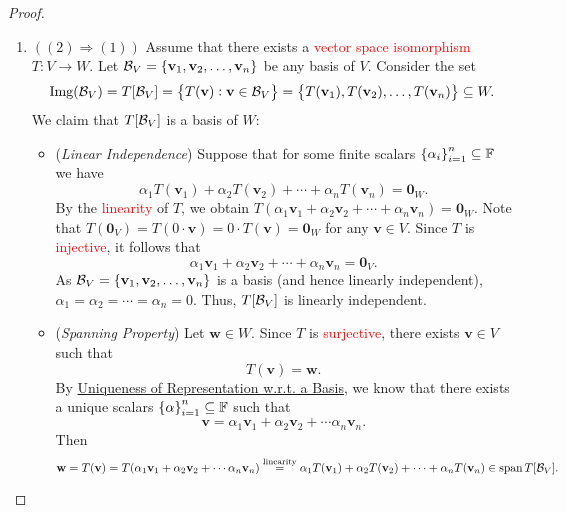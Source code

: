 \documentclass[11pt,openany]{article}
\renewcommand{\vec}[1]{\mathbf{#1}}
\begin{document}
\newpage
{}
\begin{proof}
	\begin{enumerate}[]
		\item $((2)\Rightarrow (1))$ Assume that there exists a \textcolor{red}{vector space isomorphism} $T:V\to W$. Let $\basis_V=\set{\vec{v}_1,\vec{v}_2,\dots,\vec{v}_n}$ be any basis of $V$. Consider the set \[
		\img{\basis_V}=T[\basis_V]=\set{T(\vec{v}):\vec{v}\in \basis_V}=\set{T(\vec{v}_1),T(\vec{v}_2),\dots,T(\vec{v}_n)}\subseteq W.
		\] We claim that $T[\mathcal{B}_V]$ is a basis of $W$: \begin{itemize}
			\item (\textit{Linear Independence}) Suppose that for some finite scalars $\set{\alpha_i}_{i=1}^n\subseteq \mathbb{F}$ we have \[
			\alpha_1T(\vec{v}_1)+\alpha_2T(\vec{v}_2)+\cdots+\alpha_nT(\vec{v}_n)=\vec{0}_W.
			\] By the \textcolor{red}{linearity} of $T$, we obtain $T(\alpha_1\vec{v}_1+\alpha_2\vec{v}_2+\cdots+\alpha_n\vec{v}_n)=\vec{0}_W$. Note that $T(\vec{0}_V)=T(0\cdot\vec{v})=0\cdot T(\vec{v})=\vec{0}_W$ for any $\vec{v}\in V$. Since $T$ is \textcolor{red}{injective}, it follows that \[
			\alpha_1\vec{v}_1+\alpha_2\vec{v}_2+\cdots+\alpha_n\vec{v}_n=\vec{0}_V.
			\] As $\basis_V=\set{\vec{v}_1,\vec{v}_2,\dots,\vec{v}_n}$ is a basis (and hence linearly independent), $\alpha_1=\alpha_2=\cdots=\alpha_n=0$. Thus, $T[\mathcal{B}_V]$ is linearly independent.
			\item (\textit{Spanning Property}) Let $\vec{w}\in W$. Since $T$ is \textcolor{red}{surjective}, there exists $\vec{v}\in V$ such that \[
			T(\vec{v})=\vec{w}.
			\] By \hyperlink{unique-wrt-basis}{Uniqueness of Representation w.r.t. a Basis}, we know that there exists a unique scalars $\set{\alpha}_{i=1}^n\subseteq \mathbb{F}$ such that \[
			\vec{v}=\alpha_1\vec{v}_1+\alpha_2\vec{v}_2+\cdots\alpha_n\vec{v}_n.
			\] Then \[
			\vec{w}=T(\vec{v})=T(\alpha_1\vec{v}_1+\alpha_2\vec{v}_2+\cdots\alpha_n\vec{v}_n)\overset{\text{linearity}}{=}\alpha_1 T(\vec{v}_1)+\alpha_2 T(\vec{v}_2) + \cdots +\alpha_n T(\vec{v}_n)\in \Span T[\basis_V].
\]
\end{itemize}
\end{enumerate}
\end{proof}
\end{document}
